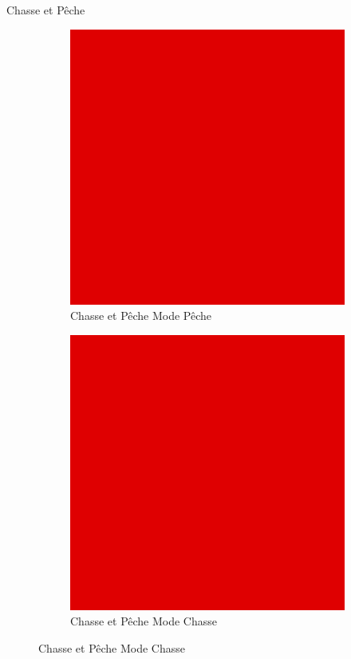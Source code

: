 	\begin{frame}{Chasse et Pêche}
	    \begin{figure}
		    \begin{subfigure}{.48\textwidth}
    		    \centering
    		    \includegraphics[width=.9\linewidth]{images/TODO.png}
                \caption*{Chasse et Pêche Mode Pêche}
                \label{fig:CPpeche}
            \end{subfigure}
            \begin{subfigure}{.48\textwidth}
                \centering
                \includegraphics[width=.9\linewidth]{images/TODO.png} %
                 \caption*{Chasse et Pêche Mode Chasse}
                \label{fig:CPchasse}
            \end{subfigure}
        \end{figure}
	\end{frame}{}
	
